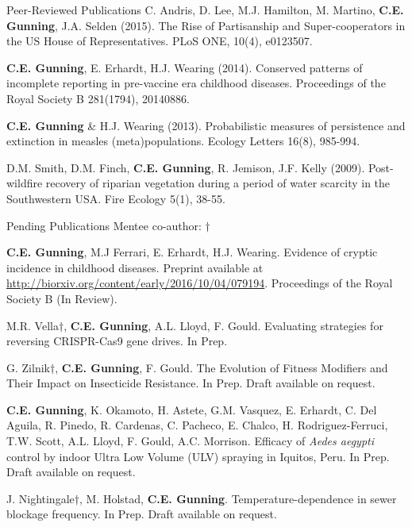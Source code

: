 \documentclass{resume} %
\begin{document}
\begin{rSection}{Peer-Reviewed Publications}
C. Andris, D. Lee, M.J.  Hamilton, M. Martino, {\bf C.E. Gunning},  J.A. Selden (2015).
The Rise of Partisanship and Super-cooperators in the US House of Representatives.
PLoS ONE, 10(4), e0123507.

{\bf C.E. Gunning}, E. Erhardt, H.J. Wearing (2014). 
Conserved patterns of incomplete reporting in pre-vaccine era childhood diseases.
Proceedings of the Royal Society B 281(1794), 20140886. 

{\bf C.E. Gunning} \& H.J. Wearing (2013). Probabilistic measures of persistence
and extinction in measles (meta)populations. Ecology Letters 16(8), 985-994.

D.M. Smith, D.M. Finch, {\bf C.E. Gunning}, R. Jemison, J.F. Kelly (2009). Post-wildfire recovery of riparian vegetation during a period of water scarcity in the Southwestern USA. Fire Ecology 5(1), 38-55.
\end{rSection}

\begin{rSection}{Pending Publications}
Mentee co-author: $\dagger$

{\bf C.E. Gunning}, M.J Ferrari, E. Erhardt, H.J. Wearing.
Evidence of cryptic incidence in childhood diseases. 
Preprint available at \url{http://biorxiv.org/content/early/2016/10/04/079194}.
Proceedings of the Royal Society B (In Review).

M.R. Vella$\dagger$, {\bf C.E. Gunning}, A.L. Lloyd, F. Gould.
Evaluating strategies for reversing CRISPR-Cas9 gene drives.
In Prep.

G. Zilnik$\dagger$, {\bf C.E. Gunning}, F. Gould.
The Evolution of Fitness Modifiers and Their Impact on Insecticide Resistance.
In Prep. Draft available on request.

{\bf C.E. Gunning}, K. Okamoto, H. Astete, G.M. Vasquez, E. Erhardt, 
C. Del Aguila, R. Pinedo, R. Cardenas, C. Pacheco, E. Chalco, 
H. Rodriguez-Ferruci, T.W. Scott, A.L. Lloyd, F. Gould, A.C. Morrison.
Efficacy of {\em Aedes aegypti} control by indoor Ultra Low Volume (ULV) spraying 
in Iquitos, Peru. 
In Prep. Draft available on request.

J. Nightingale$\dagger$, M. Holstad, {\bf C.E. Gunning}.
Temperature-dependence in sewer blockage frequency. 
In Prep. Draft available
on request.

\end{rSection}
\end{document}
